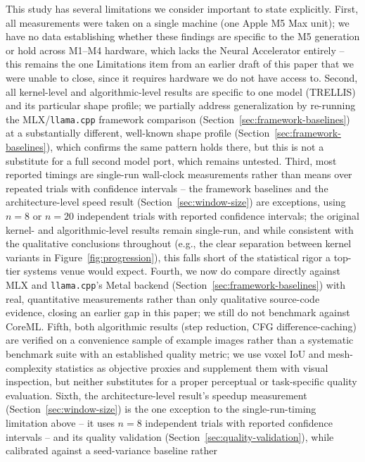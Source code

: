 \documentclass[11pt]{article}
\newcommand{\code}[1]{\texttt{#1}}
\begin{document}
This study has several limitations we consider important to state explicitly. First, all
measurements were taken on a single machine (one Apple M5 Max unit); we have no data establishing
whether these findings are specific to the M5 generation or hold across M1--M4 hardware, which
lacks the Neural Accelerator entirely -- this remains the one Limitations item from an earlier
draft of this paper that we were unable to close, since it requires hardware we do not have
access to. Second, all kernel-level and algorithmic-level results are specific to one model
(TRELLIS) and its particular shape profile; we partially address generalization by re-running the
MLX/\code{llama.cpp} framework comparison (Section~\ref{sec:framework-baselines}) at a
substantially different, well-known shape profile (Section~\ref{sec:framework-baselines}), which
confirms the same pattern holds there, but this is not a substitute for a full second model port,
which remains untested. Third, most reported timings are single-run wall-clock measurements
rather than means over repeated trials with confidence intervals -- the framework baselines and
the architecture-level speed result (Section~\ref{sec:window-size}) are exceptions, using $n=8$
or $n=20$ independent trials with reported confidence intervals; the original kernel- and
algorithmic-level results remain single-run, and while consistent with the qualitative conclusions
throughout (e.g., the clear separation between kernel variants in Figure~\ref{fig:progression}),
this falls short of the statistical rigor a top-tier systems venue would expect. Fourth, we now do
compare directly against MLX and \code{llama.cpp}'s Metal backend (Section~\ref{sec:framework-baselines})
with real, quantitative measurements rather than only qualitative source-code evidence, closing an
earlier gap in this paper; we still do not benchmark against CoreML.
Fifth, both algorithmic results (step reduction, CFG difference-caching) are verified on a
convenience sample of example images rather than a systematic benchmark suite with an established
quality metric; we use voxel IoU and mesh-complexity statistics as objective proxies and
supplement them with visual inspection, but neither substitutes for a proper perceptual or
task-specific quality evaluation. Sixth, the architecture-level result's speedup measurement
(Section~\ref{sec:window-size}) is the one exception to the single-run-timing limitation above --
it uses $n=8$ independent trials with reported confidence intervals -- and its quality validation
(Section~\ref{sec:quality-validation}), while calibrated against a seed-variance baseline rather
\end{document}
